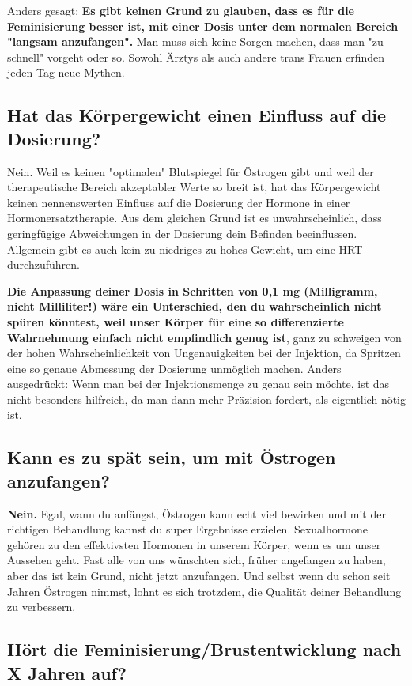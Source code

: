 \documentclass{article}
\begin{document}
Anders gesagt: \textbf{Es gibt keinen Grund zu glauben, dass es für die Feminisierung besser ist, mit einer Dosis unter dem normalen Bereich "langsam anzufangen".} Man muss sich keine Sorgen machen, dass man "zu schnell" vorgeht oder so. Sowohl Ärztys als auch andere trans Frauen erfinden jeden Tag neue Mythen.

\subsection{Hat das Körpergewicht einen Einfluss auf die Dosierung?}

Nein. Weil es keinen "optimalen" Blutspiegel für Östrogen gibt und weil der therapeutische Bereich akzeptabler Werte so breit ist, hat das Körpergewicht keinen nennenswerten Einfluss auf die Dosierung der Hormone in einer Hormonersatztherapie. Aus dem gleichen Grund ist es unwahrscheinlich, dass geringfügige Abweichungen in der Dosierung dein Befinden beeinflussen. Allgemein gibt es auch kein zu niedriges zu hohes Gewicht, um eine HRT durchzuführen.

\textbf{Die Anpassung deiner Dosis in Schritten von 0,1 mg (Milligramm, nicht Milliliter!) wäre ein Unterschied, den du wahrscheinlich nicht spüren könntest, weil unser Körper für eine so differenzierte Wahrnehmung einfach nicht empfindlich genug ist}, ganz zu schweigen von der hohen Wahrscheinlichkeit von Ungenauigkeiten bei der Injektion, da Spritzen eine so genaue Abmessung der Dosierung unmöglich machen. Anders ausgedrückt: Wenn man bei der Injektionsmenge zu genau sein möchte, ist das nicht besonders hilfreich, da man dann mehr Präzision fordert, als eigentlich nötig ist.  

\subsection{Kann es zu spät sein, um mit Östrogen anzufangen?}\label{11-5}

\textbf{Nein.} Egal, wann du anfängst, Östrogen kann echt viel bewirken und mit der richtigen Behandlung kannst du super Ergebnisse erzielen. Sexualhormone gehören zu den effektivsten Hormonen in unserem Körper, wenn es um unser Aussehen geht. Fast alle von uns wünschten sich, früher angefangen zu haben, aber das ist kein Grund, nicht jetzt anzufangen. Und selbst wenn du schon seit Jahren Östrogen nimmst, lohnt es sich trotzdem, die Qualität deiner Behandlung zu verbessern.

\subsection{Hört die Feminisierung/Brustentwicklung nach X Jahren auf?}\label{11-6}
\end{document}
